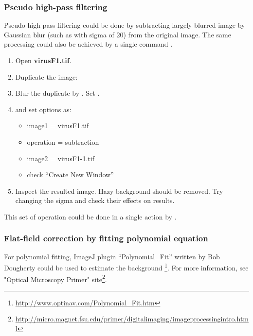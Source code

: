 \subsubsection{Pseudo high-pass filtering}

Pseudo high-pass filtering could be done by subtracting 
largely blurred image by Gaussian blur (such as with sigma of 20)  
from the original image. The same processing could also be achieved by a single command \ijmenu{Process > Filter > Unsharp Mask\ldots]}.

\begin{indentexercise}{2}
\begin{enumerate}
\item Open \textbf{virusF1.tif}.
\item Duplicate the image: 
\item Blur the duplicate by . Set . 
\item {} and set options as:
\begin{itemize}
\item image1 = virusF1.tif
\item operation = subtraction
\item image2 = virusF1-1.tif
\item check ``Create New Window''
\end{itemize}
\item Inspect the resulted image. Hazy background should be removed. Try changing the sigma and check their effects on results. 
\end{enumerate}

This set of operation could be done in a single action by .
 
\end{indentexercise}

\subsubsection{Flat-field correction by fitting polynomial equation}
For polynomial fitting, ImageJ plugin ``Polynomial\_Fit'' written by Bob
Dougherty could be used to estimate the background
\footnote{\url{http://www.optinav.com/Polynomial_Fit.htm}}. For more information, see "Optical Microscopy Primer"
site\footnote{\url{http://micro.magnet.fsu.edu/primer/digitalimaging/imageprocessingintro.html}}.

